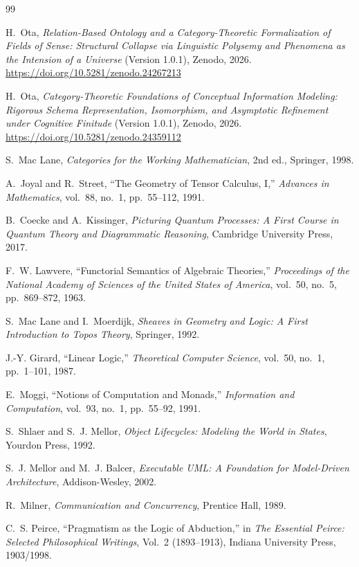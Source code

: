 \documentclass[11pt,a4paper]{ltjsarticle}
\theoremstyle{definition}
\theoremstyle{plain}
\theoremstyle{remark}
\begin{document}
\begin{thebibliography}{99}

H.~Ota, \emph{Relation-Based Ontology and a Category-Theoretic Formalization of Fields of Sense: Structural Collapse via Linguistic Polysemy and Phenomena as the Intension of a Universe} (Version 1.0.1), Zenodo, 2026. \url{https://doi.org/10.5281/zenodo.24267213}

H.~Ota, \emph{Category-Theoretic Foundations of Conceptual Information Modeling: Rigorous Schema Representation, Isomorphism, and Asymptotic Refinement under Cognitive Finitude} (Version 1.0.1), Zenodo, 2026. \url{https://doi.org/10.5281/zenodo.24359112}

S.~Mac Lane, \emph{Categories for the Working Mathematician}, 2nd ed., Springer, 1998.

A.~Joyal and R.~Street, ``The Geometry of Tensor Calculus, I,'' \emph{Advances in Mathematics}, vol.~88, no.~1, pp.~55--112, 1991.

B.~Coecke and A.~Kissinger, \emph{Picturing Quantum Processes: A First Course in Quantum Theory and Diagrammatic Reasoning}, Cambridge University Press, 2017.

F.~W. Lawvere, ``Functorial Semantics of Algebraic Theories,'' \emph{Proceedings of the National Academy of Sciences of the United States of America}, vol.~50, no.~5, pp.~869--872, 1963.

S.~Mac Lane and I.~Moerdijk, \emph{Sheaves in Geometry and Logic: A First Introduction to Topos Theory}, Springer, 1992.

J.-Y. Girard, ``Linear Logic,'' \emph{Theoretical Computer Science}, vol.~50, no.~1, pp.~1--101, 1987.

E.~Moggi, ``Notions of Computation and Monads,'' \emph{Information and Computation}, vol.~93, no.~1, pp.~55--92, 1991.

S.~Shlaer and S.~J. Mellor, \emph{Object Lifecycles: Modeling the World in States}, Yourdon Press, 1992.

S.~J. Mellor and M.~J. Balcer, \emph{Executable UML: A Foundation for Model-Driven Architecture}, Addison-Wesley, 2002.

R.~Milner, \emph{Communication and Concurrency}, Prentice Hall, 1989.

C.~S. Peirce, ``Pragmatism as the Logic of Abduction,'' in \emph{The Essential Peirce: Selected Philosophical Writings}, Vol.~2 (1893--1913), Indiana University Press, 1903/1998.


\end{thebibliography}
\end{document}
